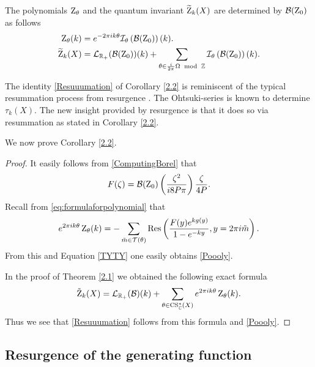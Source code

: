 \begin{corollary}  \label{2.2}
	The polynomials $\operatorname{Z}_{\theta}$ and the quantum invariant $\widetilde{\operatorname{Z}}_k(X)$  are determined by $\mathcal{B}(\operatorname{Z}_{0})$  as follows
	\begin{align} \label{Poooly}  \z_{\theta} (k) & = e^{-2\pi i k \theta} \mathcal{I}_{\theta}\left(\mathcal{B}(\z_{0})\right)(k).
	\\   \widetilde{\z}_k(X) &= \mathcal{L}_{\R_+}( \mathcal{B}(\z_{0}))(k)+\sum_{\theta \in \frac{i}{2\pi} \Omega \ \modu \ \Z} \mathcal{I}_{\theta}\left(\mathcal{B}(\z_{0})\right)(k) \label{Resuuumation} .
	\end{align}
\end{corollary} 
The identity \eqref{Resuuumation} of Corollary \ref{2.2} is reminiscent of the typical resummation process from resurgence \cite{Schiappa18,Dorigoni14}. The Ohtsuki-series is known to determine $\tau_k(X).$ The new insight provided by resurgence is that it does so via resummation as stated in Corollary \ref{2.2}.

We now prove Corollary \ref{2.2}. 
\begin{proof}
	It easily follows from \eqref{ComputingBorel} that
	\begin{equation} \label{TYTY}
	F(\zeta)= \mathcal{B}(\operatorname{Z}_{0})\left(\frac{\zeta^2}{i8P\pi}\right) \frac{\zeta }{4P}.
	\end{equation} Recall from  \eqref{eq:formulaforpolynomial} that \begin{equation} 
	e^{2\pi ik \theta} \operatorname{Z}_{\theta}(k)=- \sum_{\tilde m \in \mathcal{T}(\theta)}  \text{Res} \left( \frac{F(y)e^{kg(y)}}{1-e^{-ky}}, y=2\pi i \tilde m \right).
	\end{equation}
From this and Equation \eqref{TYTY} one easily obtains \eqref{Poooly}. 

In the proof of Theorem \ref{2.1} we obtained the following exact formula
\begin{equation} \label{eq:DecompWRT}
\tilde{\operatorname{Z}}_k(X) = \mathcal{L}_{\mathbb{R}_+}(\mathcal{B})(k)+ \sum_{\theta \in \operatorname{CS}_{\mathbb{C}}^*(X)} e^{2\pi i k \theta} \operatorname{Z}_\theta(k).
\end{equation}
Thus we see that \eqref{Resuuumation} follows from this formula and \eqref{Poooly}. 
\end{proof}

\subsection{Resurgence of the generating function} \label{sec:GeneratingFunction}

